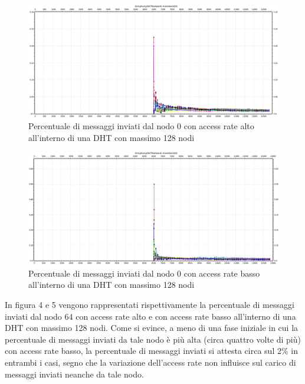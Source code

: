 \documentclass[	
	DIV=calc,
	paper=a4,
	fontsize=11pt,
	onecolumn
]{scrartcl} %
\begin{document}
	\begin{figure}[H]
		\centering
		\includegraphics[scale=0.35]	{SymphonyDHT/plots/PercentageOfMessagesSent/128_Nodes_FastAccess/SymphonyDHT_128Nodes_FastAccess_Node0.png}
		\caption{Percentuale di messaggi inviati dal nodo 0 con access rate alto all'interno di una DHT con massimo 128 nodi}
		\label{Figura 2}
	\end{figure}
	\begin{figure}[H]
		\centering
		\includegraphics[scale=0.35]	{SymphonyDHT/plots/PercentageOfMessagesSent/128_Nodes_SlowAccess/SymphonyDHT_128Nodes_SlowAccess_Node0.png}
		\caption{Percentuale di messaggi inviati dal nodo 0 con access rate basso all'interno di una DHT con massimo 128 nodi}
		\label{Figura 3}
	\end{figure}
	
	In figura 4 e 5 vengono rappresentati rispettivamente la percentuale di messaggi inviati dal nodo 64 con access rate alto e con access rate basso all'interno di una DHT con massimo 128 nodi. Come si evince, a meno di una fase iniziale in cui la percentuale di messaggi inviati da tale nodo è più alta (circa quattro volte di più) con access rate basso, la percentuale di messaggi inviati si attesta circa sul 2\% in entrambi i casi, segno che la variazione dell'access rate non influisce sul carico di messaggi inviati neanche da tale nodo.
	
\end{document}
